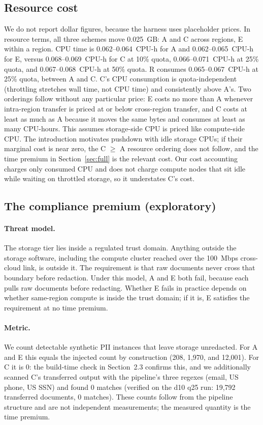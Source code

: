 \documentclass[11pt]{article}
\begin{document}
\subsection{Resource cost}

We do not report dollar figures, because the harness uses placeholder prices. In resource terms, all three schemes move 0.025~GB: A and C across regions, E within a region. CPU time is 0.062--0.064~CPU-h for A and 0.062--0.065~CPU-h for E, versus 0.068--0.069~CPU-h for C at 10\% quota, 0.066--0.071~CPU-h at 25\% quota, and 0.067--0.068~CPU-h at 50\% quota. R consumes 0.065--0.067~CPU-h at 25\% quota, between A and C. C's CPU consumption is quota-independent (throttling stretches wall time, not CPU time) and consistently above A's. Two orderings follow without any particular price: E costs no more than A whenever intra-region transfer is priced at or below cross-region transfer, and C costs at least as much as A because it moves the same bytes and consumes at least as many CPU-hours. This assumes storage-side CPU is priced like compute-side CPU. The introduction motivates pushdown with idle storage CPUs; if their marginal cost is near zero, the C $\ge$ A resource ordering does not follow, and the time premium in Section~\ref{sec:full} is the relevant cost. Our cost accounting charges only consumed CPU and does not charge compute nodes that sit idle while waiting on throttled storage, so it understates C's cost.

\subsection{The compliance premium (exploratory)}
\label{sec:compliance}

\paragraph{Threat model.} The storage tier lies inside a regulated trust domain. Anything outside the storage software, including the compute cluster reached over the 100~Mbps cross-cloud link, is outside it. The requirement is that raw documents never cross that boundary before redaction. Under this model, A and E both fail, because each pulls raw documents before redacting. Whether E fails in practice depends on whether same-region compute is inside the trust domain; if it is, E satisfies the requirement at no time premium.

\paragraph{Metric.} We count detectable synthetic PII instances that leave storage unredacted. For A and E this equals the injected count by construction (208, 1,970, and 12,001). For C it is 0: the build-time check in Section~2.3 confirms this, and we additionally scanned C's transferred output with the pipeline's three regexes (email, US phone, US SSN) and found 0 matches (verified on the d10 q25 run: 19,792 transferred documents, 0 matches). These counts follow from the pipeline structure and are not independent measurements; the measured quantity is the time premium.
\end{document}
